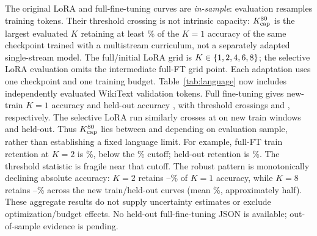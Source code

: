 \documentclass[11pt]{article}
\begin{document}
The original LoRA and full-fine-tuning curves are \emph{in-sample}: evaluation resamples training tokens. Their threshold crossing is not intrinsic capacity: $K_{\rm cap}^{80}$ is the largest evaluated $K$ retaining at least \languageThresholdPct\% of the $K=1$ accuracy of the same checkpoint trained with a multistream curriculum, not a separately adapted single-stream model. The full/initial LoRA grid is $K\in\{1,2,4,6,8\}$; the selective LoRA evaluation omits the intermediate full-FT grid point. Each adaptation uses one checkpoint and one training budget.
\iflanguageHeldout
Table~\ref{tab:language} now includes independently evaluated WikiText validation tokens. Full fine-tuning gives new-train $K=1$ accuracy \fullTrainAccuracy{} and held-out accuracy \fullHeldoutAccuracy{}, with threshold crossings \fullTrainCap{} and \fullHeldoutCap{}, respectively.
\ifsurpriseHeldout
The selective LoRA run similarly crosses at \selectiveTrainCap{} on new train windows and \selectiveHeldoutCap{} held-out. Thus $K_{\rm cap}^{80}$ lies between \languageCapMin{} and \languageCapMax{} depending on evaluation sample, rather than establishing a fixed language limit. For example, full-FT train retention at $K=2$ is \fullTrainRetentionTwo\%, below the \languageThresholdPct\% cutoff; held-out retention is \fullHeldoutRetentionTwo\%. The threshold statistic is fragile near that cutoff. The robust pattern is monotonically declining absolute accuracy: $K=2$ retains \retentionTwoMin--\retentionTwoMax\% of $K=1$ accuracy, while $K=8$ retains \retentionEightMin--\retentionEightMax\% across the new train/held-out curves (mean \retentionEightMean\%, approximately half). These aggregate results do not supply uncertainty estimates or exclude optimization/budget effects.
\fi
\else
No held-out full-fine-tuning JSON is available; out-of-sample evidence is pending.
\fi

\end{document}
